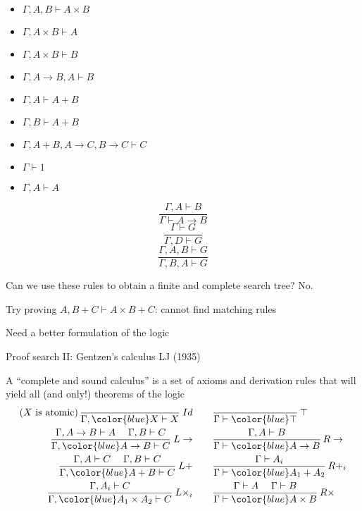 \begin{minipage}[t]{0.49\columnwidth}%
\begin{itemize}
\item $\Gamma,A,B\vdash A\times B$ 
\item $\Gamma,A\times B\vdash A$ 
\item $\Gamma,A\times B\vdash B$
\item $\Gamma,A\rightarrow B,A\vdash B$
\item $\Gamma,A\vdash A+B$ 
\item $\Gamma,B\vdash A+B$
\item $\Gamma,A+B,A\rightarrow C,B\rightarrow C\vdash C$
\item $\Gamma\vdash1$
\item $\Gamma,A\vdash A$
\end{itemize}
%
\end{minipage}%
\begin{minipage}[t]{0.49\columnwidth}%
\[
\frac{\Gamma,A\vdash B}{\Gamma\vdash A\rightarrow B}
\]
\[
\frac{\Gamma\vdash G}{\Gamma,D\vdash G}
\]
\[
\frac{\Gamma,A,B\vdash G}{\Gamma,B,A\vdash G}
\]
%
\end{minipage}

\medskip{}
Can we use these rules to obtain a finite and complete search tree?
No.

Try proving $A,B+C\vdash A\times B+C$: cannot find matching rules

Need a better formulation of the logic

Proof search II: Gentzen\textsf{'}s calculus LJ (1935)

A \textsf{``}complete and sound calculus\textsf{''} is a set of axioms and derivation
rules that will yield all (and only!) theorems of the logic
\begin{align*}
\text{(}X\text{ is atomic)\,}\frac{}{\Gamma,{\color{blue}X}\vdash X}\:Id & \qquad\frac{}{\Gamma\vdash{\color{blue}\top}}\,\top\\
\frac{\Gamma,A\rightarrow B\vdash A\quad\;\Gamma,B\vdash C}{\Gamma,{\color{blue}A\rightarrow B}\vdash C}\:L\rightarrow & \qquad\frac{\Gamma,A\vdash B}{\Gamma\vdash{\color{blue}A\rightarrow B}}\,R\rightarrow\\
\frac{\Gamma,A\vdash C\quad\;\Gamma,B\vdash C}{\Gamma,{\color{blue}A+B}\vdash C}\:L+ & \qquad\frac{\Gamma\vdash A_{i}}{\Gamma\vdash{\color{blue}A_{1}+A_{2}}}\,R+_{i}\\
\frac{\Gamma,A_{i}\vdash C}{\Gamma,{\color{blue}A_{1}\times A_{2}}\vdash C}\:L\times_{i} & \qquad\frac{\Gamma\vdash A\quad\;\Gamma\vdash B}{\Gamma\vdash{\color{blue}A\times B}}\,R\times
\end{align*}

